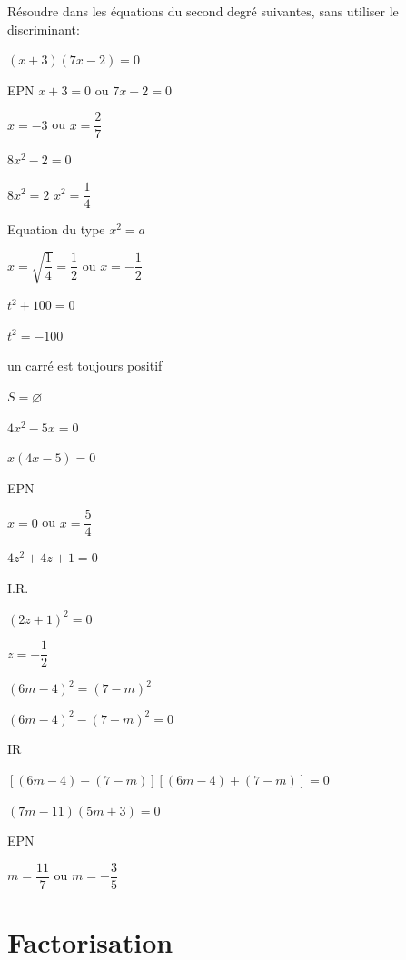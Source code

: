 \documentclass[11pt,a4paper]{article}  %
\begin{document}
Résoudre dans \R les équations du second degré suivantes, sans utiliser le discriminant:
\begin{enumMet}
	\item $(x+3)(7 x-2)=0$
	\begin{corrBox}
		EPN
		$x+3=0$ ou $7x-2=0$
		
		$x=-3$ ou $x=\dfrac{2}{7}$		
	\end{corrBox}
	\item $8 x^2-2=0$
	\begin{corrBox}
		$8x^2=2$
		$x^2=\dfrac{1}{4}$
		
		Equation du type $x^2=a$
		
		$x=\sqrt{\dfrac{1}{4}}=\dfrac{1}{2}$ ou $x=-\dfrac{1}{2}$		
	\end{corrBox}
	\item $t^2+100=0$
	\begin{corrBox}
		$t^2=-100$
		
		un carré est toujours positif
		
		$S=\varnothing$
	\end{corrBox}
	\item $4 x^2-5 x=0$
	\begin{corrBox}
		$x(4x-5)=0$
		
		EPN
		
		$x=0$ ou $x=\dfrac{5}{4}$		
	\end{corrBox}
	\item $4 z^2+4 z+1=0$
	\begin{corrBox}
		I.R.
		
		$(2z+1)^2=0$
		
		$z=-\dfrac{1}{2}$		
	\end{corrBox}
	\item $(6 m-4)^2=(7-m)^2$
	\begin{corrBox}
		$(6 m-4)^2-(7-m)^2=0$
		
		IR
		
		$[(6m-4)-(7-m)][(6m-4)+(7-m)]=0$
		
		$(7m-11)(5m+3)=0$
		
		EPN
		
		$m=\dfrac{11}{7}$ ou $m=-\dfrac{3}{5}$
	\end{corrBox}
\end{enumMet}


\section*{Factorisation}
\end{document}
